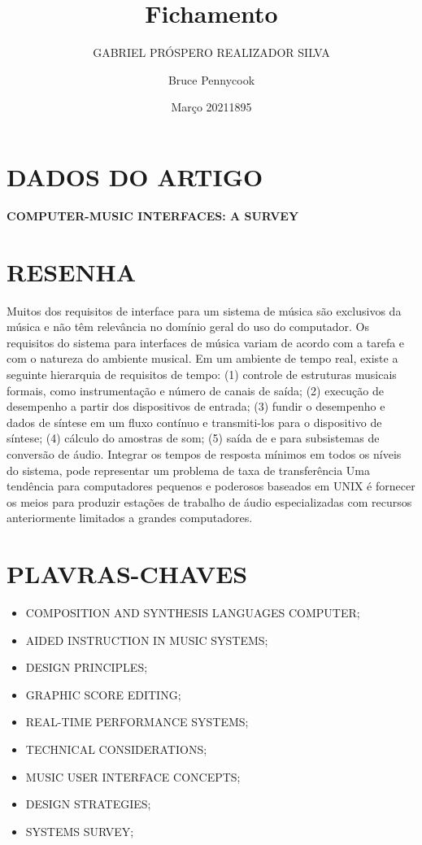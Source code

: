 \documentclass{article}
\title{Fichamento}
\author{GABRIEL PRÓSPERO REALIZADOR  SILVA}
\date{Março 2021}
\begin{document}
\maketitle

\section{DADOS DO ARTIGO}
\textbf{COMPUTER-MUSIC INTERFACES: A SURVEY \\}
\author{Bruce Pennycook \\}
\date{1895}

\section{RESENHA}
Muitos dos requisitos de interface para um sistema de música são exclusivos da música e não têm relevância no domínio geral do uso do computador. Os requisitos do sistema para interfaces de música variam de acordo com a tarefa e com o natureza do ambiente musical. Em um ambiente de tempo real, existe a seguinte hierarquia de requisitos de tempo: (1) controle de estruturas musicais formais, como instrumentação e número de canais de saída; (2) execução de desempenho a partir dos dispositivos de entrada; (3) fundir o desempenho e dados de síntese em um fluxo contínuo e transmiti-los para o dispositivo de síntese; (4) cálculo do amostras de som; (5) saída de e para subsistemas de conversão de áudio. Integrar os tempos de resposta mínimos em todos os níveis do sistema, pode representar um problema de taxa de transferência Uma tendência para computadores pequenos e poderosos baseados em UNIX é fornecer os meios para produzir estações de trabalho de áudio especializadas com recursos anteriormente limitados a grandes computadores.

\section{PLAVRAS-CHAVES}
\begin{itemize}
    \item COMPOSITION AND SYNTHESIS LANGUAGES COMPUTER; 
    \item AIDED INSTRUCTION IN MUSIC SYSTEMS; 
    \item DESIGN PRINCIPLES; 
    \item GRAPHIC SCORE EDITING; 
    \item REAL-TIME PERFORMANCE SYSTEMS; 
    \item TECHNICAL CONSIDERATIONS; 
    \item MUSIC USER INTERFACE CONCEPTS; 
    \item DESIGN STRATEGIES; 
    \item SYSTEMS SURVEY;
\end{itemize}
\end{document}
